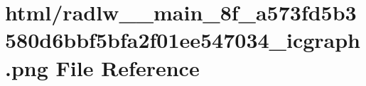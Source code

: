 \hypertarget{radlw____main__8f__a573fd5b3580d6bbf5bfa2f01ee547034__icgraph_8png}{}\section{html/radlw\+\_\+\+\_\+main\+\_\+8f\+\_\+a573fd5b3580d6bbf5bfa2f01ee547034\+\_\+icgraph.png File Reference}
\label{radlw____main__8f__a573fd5b3580d6bbf5bfa2f01ee547034__icgraph_8png}
